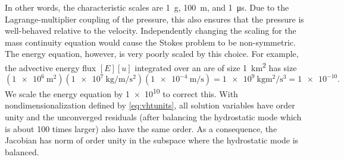 In other words, the characteristic scales are \SI{1}{\gram}, \SI{100}{\metre}, and \SI{1}{\micro\second}.
Due to the Lagrange-multiplier coupling of the pressure, this also ensures that the pressure is well-behaved relative to the velocity.
Independently changing the scaling for the mass continuity equation would cause the Stokes problem to be non-symmetric.
The energy equation, however, is very poorly scaled by this choice.
For example, the advective energy flux $[E][u]$ integrated over an are of size \SI{1}{\kilo\metre\squared} has size
\begin{equation*}
  (\SI{1e6}{\metre\squared}) (\SI{1e7}{\kilo\gram\per\metre\per\second\squared}) (\SI{1e-4}{\metre\per\second}) = \SI{1e9}{\kilo\gram\metre\squared\per\second\cubed} = \num{1e-10} .
\end{equation*}
We scale the energy equation by \num{1e10} to correct this.
With nondimensionalization defined by \eqref{eq:vhtunits}, all solution variables have order unity and the unconverged residuals (after balancing the hydrostatic mode which is about 100 times larger) also have the same order.
As a consequence, the Jacobian has norm of order unity in the subspace where the hydrostatic mode is balanced.
